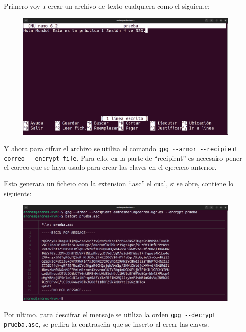 \documentclass{article}
\begin{document}
Primero voy a crear un archivo de texto cualquiera como el siguiente:

\begin{figure}[H]
    \includegraphics[width=\textwidth]{imagenes/Captura desde 2022-10-19 16-57-15.png}
\end{figure}

Y ahora para cifrar el archivo se utiliza el comando \verb|gpg --armor --recipient correo --encrypt file|. Para ello, en la parte de ``recipient'' es necesairo poner el correo que se haya usado para crear las claves en el ejercicio anterior.

Esto generara un fichero con la extension ``.asc'' el cual, si se abre, contiene lo siguiente:

\begin{figure}[H]
    \includegraphics[width=\textwidth]{imagenes/Captura desde 2022-10-19 17-06-08.png}
\end{figure}


Por ultimo, para descifrar el mensaje se utiliza la orden \verb|gpg --decrypt prueba.asc|, se pedira la contraseña que se inserto al crear las claves.
\end{document}
